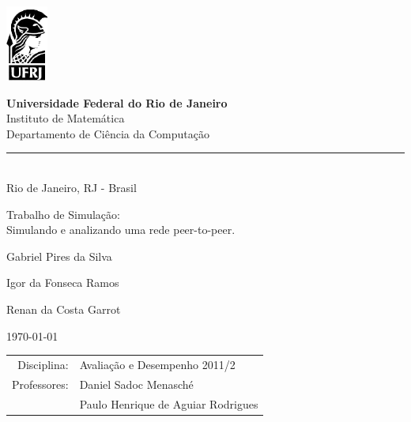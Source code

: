 \documentclass[a4paper,10pt]{article}
\begin{document}
\begin{titlepage}

\begin{minipage}{0.2\linewidth}
 \includegraphics[]{./minerva.png}
\end{minipage}
\begin{minipage}{0.8\linewidth}
 \textbf{Universidade Federal do Rio de Janeiro}\\
 Instituto de Matemática\\
 Departamento de Ciência da Computação\\
 \rule{0.8\linewidth}{0.5mm}\\
 Rio de Janeiro, RJ - Brasil
\end{minipage}

\begin{center}

\vspace{2cm}

\Large
Trabalho de Simulação:\\ Simulando e analizando uma rede peer-to-peer.

\vspace{1cm}

\large

Gabriel Pires da Silva

\vspace{0.5cm}

Igor da Fonseca Ramos

\vspace{0.5cm}

Renan da Costa Garrot

\vspace{2.5cm}

\today

\normalsize
\end{center}

\vfill

\begin{flushright}
\begin{tabular}{rl}
Disciplina: & Avaliação e Desempenho 2011/2\\
Professores: & Daniel Sadoc Menasché\\
 & Paulo Henrique de Aguiar Rodrigues\\
\end{tabular}
\end{flushright}

\vspace{2cm}

\end{titlepage}
\end{document}
